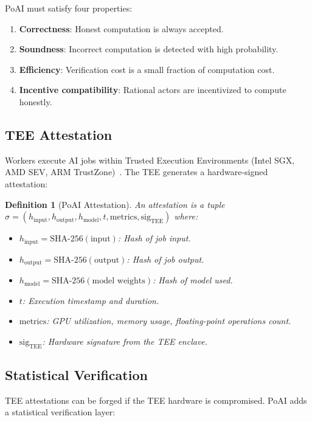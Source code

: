 \documentclass[11pt,twocolumn]{article}
\newtheorem{definition}{Definition}
\begin{document}
PoAI must satisfy four properties:

\begin{enumerate}[leftmargin=1.4em]
    \item \textbf{Correctness}: Honest computation is always accepted.
    \item \textbf{Soundness}: Incorrect computation is detected with high probability.
    \item \textbf{Efficiency}: Verification cost is a small fraction of computation cost.
    \item \textbf{Incentive compatibility}: Rational actors are incentivized to compute honestly.
\end{enumerate}

\subsection{TEE Attestation}

Workers execute AI jobs within Trusted Execution Environments (Intel SGX, AMD SEV, ARM TrustZone)~\cite{costan2016intel}. The TEE generates a hardware-signed attestation:

\begin{definition}[PoAI Attestation]
An attestation is a tuple $\sigma = (h_{\text{input}}, h_{\text{output}}, h_{\text{model}}, t, \text{metrics}, \text{sig}_{\text{TEE}})$ where:
\begin{itemize}[leftmargin=1.1em]
    \item $h_{\text{input}} = \text{SHA-256}(\text{input})$: Hash of job input.
    \item $h_{\text{output}} = \text{SHA-256}(\text{output})$: Hash of job output.
    \item $h_{\text{model}} = \text{SHA-256}(\text{model weights})$: Hash of model used.
    \item $t$: Execution timestamp and duration.
    \item $\text{metrics}$: GPU utilization, memory usage, floating-point operations count.
    \item $\text{sig}_{\text{TEE}}$: Hardware signature from the TEE enclave.
\end{itemize}
\end{definition}

\subsection{Statistical Verification}

TEE attestations can be forged if the TEE hardware is compromised. PoAI adds a statistical verification layer:
\end{document}
